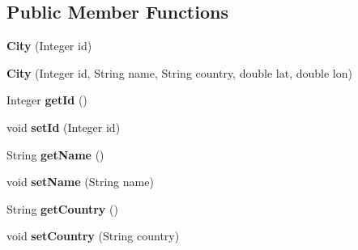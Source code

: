 \subsection*{Public Member Functions}
\begin{DoxyCompactItemize}
\item 
\hypertarget{classit_1_1polimi_1_1se_1_1calcare_1_1entities_1_1City_ac2566c554255c0e44cb9b590fac66372}{}{\bfseries City} (Integer id)\label{classit_1_1polimi_1_1se_1_1calcare_1_1entities_1_1City_ac2566c554255c0e44cb9b590fac66372}

\item 
\hypertarget{classit_1_1polimi_1_1se_1_1calcare_1_1entities_1_1City_a581d638ef5b6cd5b880cd6f1f8b2aae3}{}{\bfseries City} (Integer id, String name, String country, double lat, double lon)\label{classit_1_1polimi_1_1se_1_1calcare_1_1entities_1_1City_a581d638ef5b6cd5b880cd6f1f8b2aae3}

\item 
\hypertarget{classit_1_1polimi_1_1se_1_1calcare_1_1entities_1_1City_a77b168520fa5d9f79469350bd52cbb3b}{}Integer {\bfseries get\+Id} ()\label{classit_1_1polimi_1_1se_1_1calcare_1_1entities_1_1City_a77b168520fa5d9f79469350bd52cbb3b}

\item 
\hypertarget{classit_1_1polimi_1_1se_1_1calcare_1_1entities_1_1City_a116f4f546769fb27e6be4715fa38c12e}{}void {\bfseries set\+Id} (Integer id)\label{classit_1_1polimi_1_1se_1_1calcare_1_1entities_1_1City_a116f4f546769fb27e6be4715fa38c12e}

\item 
\hypertarget{classit_1_1polimi_1_1se_1_1calcare_1_1entities_1_1City_a15adea2517549737d2f6a7c6f65ac763}{}String {\bfseries get\+Name} ()\label{classit_1_1polimi_1_1se_1_1calcare_1_1entities_1_1City_a15adea2517549737d2f6a7c6f65ac763}

\item 
\hypertarget{classit_1_1polimi_1_1se_1_1calcare_1_1entities_1_1City_a205c0895a1a10b5c30421241eaab0a4e}{}void {\bfseries set\+Name} (String name)\label{classit_1_1polimi_1_1se_1_1calcare_1_1entities_1_1City_a205c0895a1a10b5c30421241eaab0a4e}

\item 
\hypertarget{classit_1_1polimi_1_1se_1_1calcare_1_1entities_1_1City_a2bd87b3c2f3b05e1a32711cd8a138764}{}String {\bfseries get\+Country} ()\label{classit_1_1polimi_1_1se_1_1calcare_1_1entities_1_1City_a2bd87b3c2f3b05e1a32711cd8a138764}

\item 
\hypertarget{classit_1_1polimi_1_1se_1_1calcare_1_1entities_1_1City_a065dd94b514f4c5c10fb30a9d9f68289}{}void {\bfseries set\+Country} (String country)\label{classit_1_1polimi_1_1se_1_1calcare_1_1entities_1_1City_a065dd94b514f4c5c10fb30a9d9f68289}


\end{DoxyCompactItemize}
